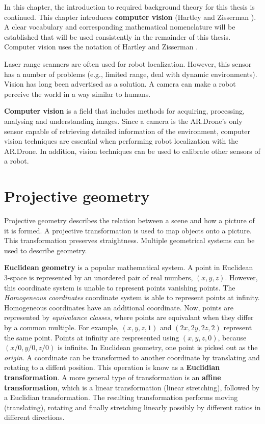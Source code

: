 In this chapter, the introduction to required background theory for this thesis is continued.
This chapter introduces \textbf{computer vision} (Hartley and Zisserman \cite{Hartley2004}).
A clear vocabulary and corresponding mathematical nomenclature will be established that will be used consistently in the remainder of this thesis.
Computer vision uses the notation of Hartley and Zisserman \cite{Hartley2004}.

Laser range scanners are often used for robot localization.
However, this sensor has a number of problems (e.g., limited range, deal with dynamic environments).
Vision has long been advertised as a solution.
A camera can make a robot perceive the world in a way similar to humans.

\textbf{Computer vision} is a field that includes methods for acquiring, processing, analysing and understanding images.
Since a camera is the AR.Drone's only sensor capable of retrieving detailed information of the environment, computer vision techniques are essential when performing robot localization with the AR.Drone.
In addition, vision techniques can be used to calibrate other sensors of a robot.

\section{Projective geometry}
\label{sec:background-projective-geometry}
Projective geometry describes the relation between a scene and how a picture of it is formed.
A projective transformation is used to map objects onto a picture.
This transformation preserves straightness.
Multiple geometrical systems can be used to describe geometry.

\textbf{Euclidean geometry} is a popular mathematical system.
A point in Euclidean 3-space is represented by an unordered pair of real numbers, $(x, y, z)$.
However, this coordinate system is unable to represent points vanishing points.
The \textit{Homogeneous coordinates} coordinate system is able to represent points at infinity.
Homogeneous coordinates have an additional coordinate.
Now, points are represented by \textit{equivalance classes}, where points are equivalant when they differ by a common multiple.
For example, $(x, y, z, 1)$ and $(2x, 2y, 2z, 2)$ represent the same point.
Points at infinity are respresented using $(x, y, z, 0)$, because $(x/0, y/0, z/0)$ is infinite.
In Euclidean geometry, one point is picked out as the \textit{origin}.
A coordinate can be transformed to another coordinate by translating and rotating to a diffent position.
This operation is know as a \textbf{Euclidian transformation}.
A more general type of transformation is an \textbf{affine transformation}, which is a linear transformation (linear stretching), followed by a Euclidian transformation.
The resulting transformation performs moving (translating), rotating and finally stretching linearly possibly by different ratios in different directions.

